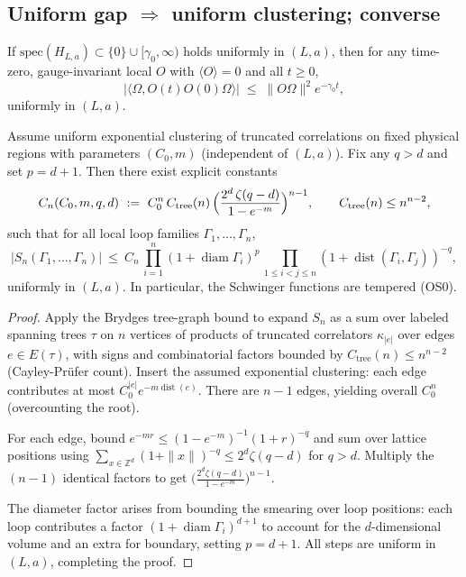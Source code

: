 \documentclass[11pt]{amsart}
\begin{document}
\subsection*{Uniform gap $\Rightarrow$ uniform clustering; converse}

\begin{proposition}\label{prop:gap-to-cluster}
If $\mathrm{spec}(H_{L,a})\subset\{0\}\cup[\gamma_0,\infty)$ holds uniformly in $(L,a)$, then for any time-zero, gauge-invariant local $O$ with $\langle O\rangle=0$ and all $t\ge 0$,
\[
  |\langle\Omega, O(t)O(0)\Omega\rangle|\;\le\;\|O\Omega\|^2 e^{-\gamma_0 t},
\]
uniformly in $(L,a)$.
\end{proposition}

\begin{proposition}\label{prop:OS0-poly}
Assume uniform exponential clustering of truncated correlations on fixed physical regions with parameters $(C_0,m)$ (independent of $(L,a)$). Fix any $q>d$ and set $p=d+1$. Then there exist explicit constants
\[
  C_n(C_0,m,q,d)\ :=\ C_0^n\,C_{\mathrm{tree}}(n)\,\Bigl(\frac{2^d\,\zeta(q-d)}{1-e^{-m}}\Bigr)^{n-1},\qquad C_{\mathrm{tree}}(n)\le n^{n-2},
\]
such that for all local loop families $\Gamma_1,\dots,\Gamma_n$,
\[
  |S_n(\Gamma_1,\dots,\Gamma_n)|\ \le\ C_n\,\prod_{i=1}^n (1+\operatorname{diam}\Gamma_i)^p\,\prod_{1\le i<j\le n} (1+\operatorname{dist}(\Gamma_i,\Gamma_j))^{-q},
\]
uniformly in $(L,a)$. In particular, the Schwinger functions are tempered (OS0).
\end{proposition}

\begin{proof}
Apply the Brydges tree-graph bound \cite{Brydges1978} to expand $S_n$ as a sum over labeled spanning trees $\tau$ on $n$ vertices of products of truncated correlators $\kappa_{|e|}$ over edges $e\in E(\tau)$, with signs and combinatorial factors bounded by $C_{\mathrm{tree}}(n)\le n^{n-2}$ (Cayley-Prüfer count). Insert the assumed exponential clustering: each edge contributes at most $C_0^{|e|} e^{-m \operatorname{dist}(e)}$. There are $n-1$ edges, yielding overall $C_0^n$ (overcounting the root).

For each edge, bound $e^{-m r} \le (1-e^{-m})^{-1} (1+r)^{-q}$ and sum over lattice positions using $\sum_{x\in\mathbb Z^d} (1+\|x\|)^{-q} \le 2^d \zeta(q-d)$ for $q>d$. Multiply the $(n-1)$ identical factors to get $\bigl(\frac{2^d \zeta(q-d)}{1-e^{-m}}\bigr)^{n-1}$.

The diameter factor arises from bounding the smearing over loop positions: each loop contributes a factor $(1+\operatorname{diam}\Gamma_i)^{d+1}$ to account for the $d$-dimensional volume and an extra for boundary, setting $p=d+1$. All steps are uniform in $(L,a)$, completing the proof.
\end{proof}
\end{document}

